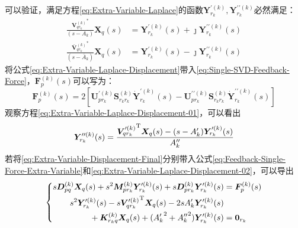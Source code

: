 可以验证，满足方程\eqref{eq:Extra-Variable-Laplace}的函数$\boldsymbol{Y}_{r_k}^{\prime(k)}, \boldsymbol{Y}_{r_k}^{\prime\prime(k)}$必然满足：
\begin{subequations}
  \label{eq:Extra-Variable-Laplace-Displacement}
  \begin{align}
    {\displaystyle\frac{{\boldsymbol{V}_{qr_k}^{(k)}}^{*}}{(s-A_k)}} \boldsymbol{X}_q(s)               & = \boldsymbol{Y}_{r_k}^{\prime(k)}(s)+ \jmath\boldsymbol{Y}_{r_k}^{\prime\prime(k)}(s)  \label{eq:Extra-Variable-Laplace-Displacement-01} \\
    {\displaystyle\frac{\boldsymbol{\bar{V}}{{}_{qr_k}^{(k)}}^{*}}{(s-\bar{A}_k)}} \boldsymbol{X}_q(s) & = \boldsymbol{Y}_{r_k}^{\prime(k)}(s)- \jmath\boldsymbol{Y}_{r_k}^{\prime\prime(k)}(s)  \label{eq:Extra-Variable-Laplace-Displacement-02}
  \end{align}
\end{subequations}
将公式\eqref{eq:Extra-Variable-Laplace-Displacement}带入\eqref{eq:Single-SVD-Feedback-Force}，$\boldsymbol{F}_p^{(k)}(s)$可以写为：
\begin{equation}
  \label{eq:Feedback-Single-Force-Extra-Variable}
  \boldsymbol{F}_p^{(k)}(s)=2\left[ \boldsymbol{U}_{pr_k}^{\prime(k)}\boldsymbol{S}_{r_kr_k}^{(k)} \dot{\boldsymbol{Y}}_{r_k}^{\prime(k)}(s)-
    \boldsymbol{U}_{pr_k}^{\prime\prime(k)}\boldsymbol{S}_{r_kr_k}^{(k)} \dot{\boldsymbol{Y}}_{r_k}^{\prime\prime(k)}(s)
    \right]
\end{equation}
观察方程\eqref{eq:Extra-Variable-Laplace-Displacement-01}，可以看出
\begin{equation}
  \label{eq:Extra-Variable-Displacement-Final}
  \boldsymbol{Y}_{r_k}^{\prime\prime(k)}(s)= {\displaystyle\frac{{\boldsymbol{V}_{qr_k}^{\prime(k)}}^{\mathrm{T}} \boldsymbol{X}_q(s)-(s-A'_k)\boldsymbol{Y}_{r_k}^{\prime(k)}(s)}{A''_k}}
\end{equation}
若将\eqref{eq:Extra-Variable-Displacement-Final}分别带入公式\eqref{eq:Feedback-Single-Force-Extra-Variable}和\eqref{eq:Extra-Variable-Laplace-Displacement-02}，可以导出
\begin{equation}
  \label{eq:Feedback-Force-Final}
  \left\{
  \begin{aligned}
    s\boldsymbol{D}_{pq}^{(k)}\boldsymbol{X}_{q}(s)+ s^2\boldsymbol{M}_{pr_k}^{(k)}\boldsymbol{Y}_{r_k}^{\prime(k)}(s)+ s\boldsymbol{D}_{pr_k}^{(k)}\boldsymbol{Y}_{r_k}^{\prime(k)}(s) & = \boldsymbol{F}_{p}^{(k)}(s) \\
    s^{2}\boldsymbol{Y}_{r_k}^{\prime(k)}(s)-s{\boldsymbol{V}_{qr_k}^{\prime(k)}}^{\mathrm{T}} \boldsymbol{X}_{q}(s)- 2sA'_k\boldsymbol{Y}_{r_k}^{\prime(k)}(s)                                                                \\
    \qquad {} + \boldsymbol{K}_{r_kq}^{(k)}\boldsymbol{X}_{q}(s)+ ({A'_k}^2+{A''_k}^{2})\boldsymbol{Y}_{r_k}^{\prime(k)}(s)                                                             & =  \boldsymbol{0}_{r_k}
  \end{aligned} \right.
\end{equation}
